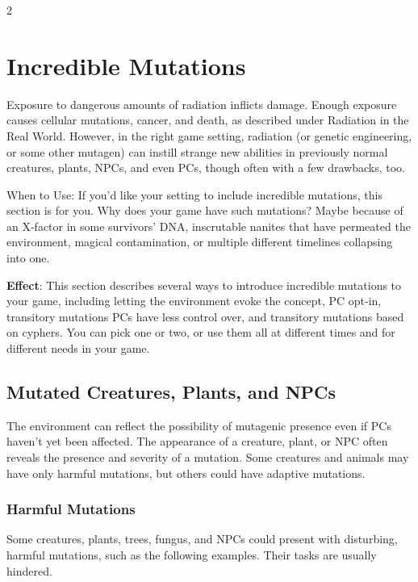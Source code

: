 \begin{multicols}{2}

\section{Incredible Mutations}

Exposure to dangerous amounts of radiation inflicts damage. Enough exposure causes cellular mutations, cancer, and death, as described under Radiation in the Real World. However, in the right game setting, radiation (or genetic engineering, or some other mutagen) can instill strange new abilities in previously normal creatures, plants, NPCs, and even PCs, though often with a few drawbacks, too. 

When to Use: If you’d like your setting to include incredible mutations, this section is for you. Why does your game have such mutations? Maybe because of an X‑factor in some survivors’ DNA, inscrutable nanites that have permeated the environment, magical contamination, or multiple different timelines collapsing into one. 

\textbf{Effect}: This section describes several ways to introduce incredible mutations to your game, including letting the environment evoke the concept, PC opt‑in, transitory mutations PCs have less control over, and transitory mutations based on cyphers. You can pick one or two, or use them all at different times and for different needs in your game.

\subsection{Mutated Creatures, Plants, and NPCs}

The environment can reflect the possibility of mutagenic presence even if PCs haven’t yet been affected. The appearance of a creature, plant, or NPC often reveals the presence and severity of a mutation. Some creatures and animals may have only harmful mutations, but others could have adaptive mutations. 

\subsubsection{Harmful Mutations}

Some creatures, plants, trees, fungus, and NPCs could present with disturbing, harmful mutations, such as the following examples. Their tasks are usually hindered. 


\end{multicols}
